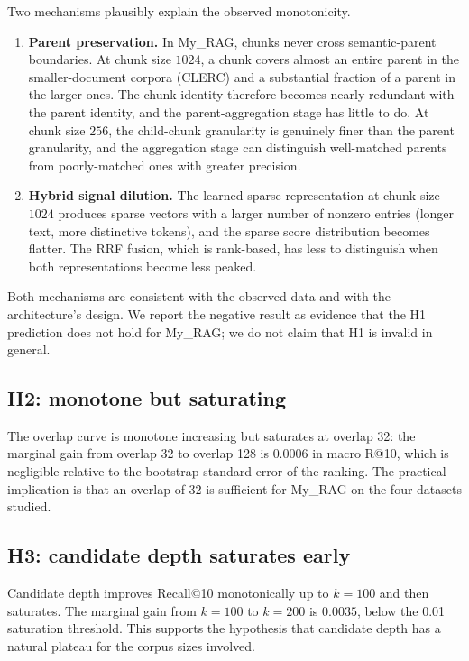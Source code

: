 \documentclass[11pt,a4paper]{article}
\begin{document}
Two mechanisms plausibly explain the observed monotonicity.

\begin{enumerate}[leftmargin=1.5em,itemsep=0.15em]
  \item \textbf{Parent preservation.} In My\_RAG, chunks never cross
    semantic-parent boundaries. At chunk size $1024$, a chunk
    covers almost an entire parent in the smaller-document corpora
    (CLERC) and a substantial fraction of a parent in the larger
    ones. The chunk identity therefore becomes nearly redundant
    with the parent identity, and the parent-aggregation stage has
    little to do. At chunk size $256$, the child-chunk granularity
    is genuinely finer than the parent granularity, and the
    aggregation stage can distinguish well-matched parents from
    poorly-matched ones with greater precision.
  \item \textbf{Hybrid signal dilution.} The learned-sparse
    representation at chunk size $1024$ produces sparse vectors
    with a larger number of nonzero entries (longer text, more
    distinctive tokens), and the sparse score distribution becomes
    flatter. The RRF fusion, which is rank-based, has less to
    distinguish when both representations become less peaked.
\end{enumerate}

Both mechanisms are consistent with the observed data and with the
architecture's design. We report the negative result as evidence
that the H1 prediction does not hold for My\_RAG; we do not claim
that H1 is invalid in general.

\subsection{H2: monotone but saturating}
The overlap curve is monotone increasing but saturates at overlap
\num{32}: the marginal gain from overlap \num{32} to overlap
\num{128} is $\num{0.0006}$ in macro R@10, which is negligible
relative to the bootstrap standard error of the ranking. The
practical implication is that an overlap of \num{32} is sufficient
for My\_RAG on the four datasets studied.

\subsection{H3: candidate depth saturates early}
Candidate depth improves Recall@10 monotonically up to $k=100$ and
then saturates. The marginal gain from $k=100$ to $k=200$ is
$\num{0.0035}$, below the \num{0.01} saturation threshold. This
supports the hypothesis that candidate depth has a natural plateau
for the corpus sizes involved.
\end{document}
